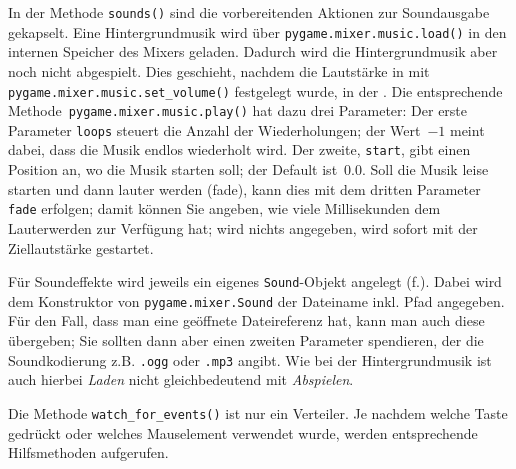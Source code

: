 In der Methode \texttt{sounds()} sind die vorbereitenden Aktionen zur Soundausgabe gekapselt. Eine Hintergrundmusik wird über \texttt{pygame.mixer.music.load()} in den internen Speicher des Mixers geladen. Dadurch wird die Hintergrundmusik aber noch nicht abgespielt. Dies geschieht, nachdem die Lautstärke in  mit \texttt{pygame.mixer.music.set\-\_vol\-ume()} festgelegt wurde, in der . Die entsprechende Methode\texttt{ pygame.mixer\-.mu\-sic.play()} hat dazu drei Parameter: Der erste Parameter \texttt{loops} steuert die Anzahl der Wiederholungen; der Wert~$-1$ meint dabei, dass die Musik endlos wiederholt wird. Der zweite, \texttt{start}, gibt einen Position an, wo die Musik starten soll; der Default ist~$0.0$. Soll die Musik leise starten und dann lauter werden (\gls{fade}), kann dies mit dem dritten Parameter \texttt{fade} erfolgen; damit können Sie angeben, wie viele Millisekunden dem Lauterwerden zur Verfügung hat; wird nichts angegeben, wird sofort mit der Ziellautstärke gestartet. 

Für Soundeffekte wird jeweils ein eigenes \texttt{Sound}-Objekt angelegt (f.). Dabei wird dem Konstruktor von \texttt{pygame.mixer.Sound} der Dateiname inkl. Pfad angegeben. Für den Fall, dass man eine geöffnete Dateireferenz hat, kann man auch diese übergeben; Sie sollten dann aber einen zweiten Parameter spendieren, der die Soundkodierung z.B. \texttt{.\gls{ogg}} oder \texttt{.\gls{mp3}} angibt. Wie bei der Hintergrundmusik ist auch hierbei \emph{Laden} nicht gleichbedeutend mit \emph{Abspielen}.


Die Methode \texttt{watch\_for\_events()} ist nur ein Verteiler. Je nachdem welche Taste gedrückt oder welches Mauselement verwendet wurde, werden entsprechende Hilfsmethoden aufgerufen.

\newpage


